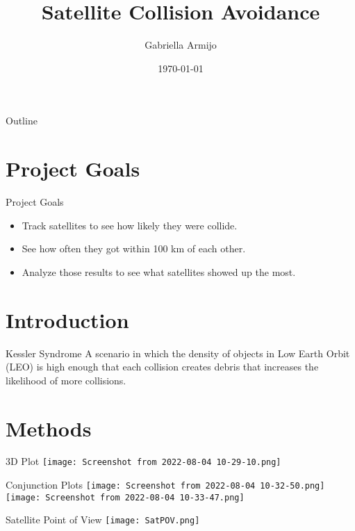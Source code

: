 \documentclass{beamer}
\title{Satellite Collision Avoidance}
\author{Gabriella Armijo}
\institute{Institute for Computing in Research}
\date{\today}
\begin{document}
\begin{frame}
    \titlepage 
\end{frame}

\logo{}


\begin{frame}{Outline}
    \tableofcontents
\end{frame}

\section{Project Goals}
\begin{frame}{Project Goals}
\begin{itemize}
\item Track satellites to see how likely they were collide. 
\item See how often they got within 100 km of each other. 
\item Analyze those results to see what satellites showed up the most.
\end{itemize}
\end{frame}

\section{Introduction}
\begin{frame}{Kessler Syndrome}
A scenario in which the density of objects in Low Earth Orbit (LEO) is high enough that each collision creates debris that increases the likelihood of more collisions.
\end{frame}

\section{Methods}
\begin{frame}{3D Plot}
\centering
\texttt{[image: Screenshot from 2022-08-04 10-29-10.png]}
\end{frame}

\begin{frame}{Conjunction Plots}
\texttt{[image: Screenshot from 2022-08-04 10-32-50.png]}
\texttt{[image: Screenshot from 2022-08-04 10-33-47.png]}
\end{frame}

\begin{frame}{Satellite Point of View}
\centering
\texttt{[image: SatPOV.png]}
\end{frame}
\end{document}
